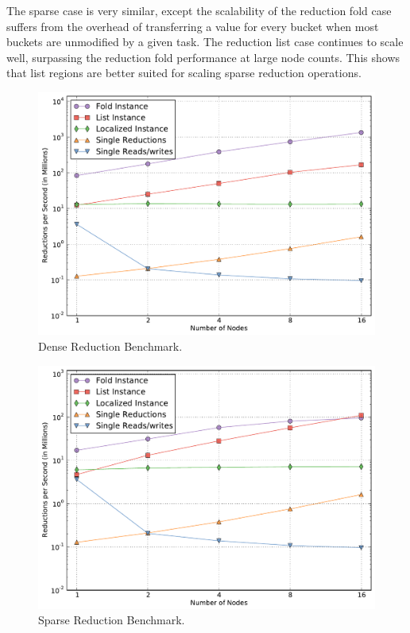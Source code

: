 The sparse case is very similar, except the scalability of the reduction fold case suffers from the
overhead of transferring a value for every bucket when most buckets are unmodified by a given task.
The reduction list case continues to scale well, surpassing the reduction fold performance at large
node counts.  This shows that
list regions are better suited for scaling sparse reduction operations.

\begin{figure}
\begin{center}
\includegraphics[scale=0.33]{figs/reduce_dense.pdf}
\end{center}
\vspace{-6mm}
\caption{Dense Reduction Benchmark.\label{fig:reducdense}}
\vspace{-4mm}
\end{figure}

\begin{figure}
\begin{center}
\includegraphics[scale=0.33]{figs/reduce_sparse.pdf}
\end{center}
\vspace{-6mm}
\caption{Sparse Reduction Benchmark.\label{fig:reducsparse}}
\vspace{-4mm}
\end{figure}

